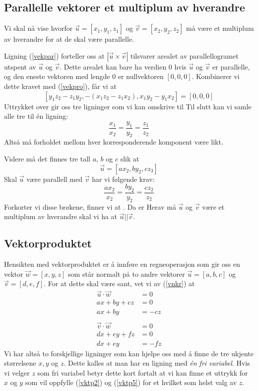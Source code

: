 \kryarvo

\newpage
{}
\subsection*{Parallelle vektorer et multiplum av hverandre}
Vi skal nå vise hvorfor $ {\vec{u}=[x_1, y_1, z_1]} $ og $ {\vec{v}=[x_2, y_2, z_2] }$ må være et multiplum av hverandre for at de skal være parallelle. \vsk

Ligning (\ref{vekpar}) forteller oss at $ |\vec{u}\times\vec{v}| $ tilsvarer arealet av parallellogramet utspent av $ \vec{u} $ og $ \vec{v} $. Dette arealet kan bare ha verdien 0 hvis $ \vec{u} $ og $ \vec{v} $ er parallelle, og den eneste vektoren med lengde 0 er nullvektoren $ [0,0,0] $. Kombinerer vi dette kravet med (\ref{vekpro}), får vi at
\[ [y_1z_2-z_1y_2, -(x_1z_2-z_1x_2), x_1y_2-y_1x_2]=[0, 0, 0] \]
Uttrykket over gir oss tre ligninger
som vi kan omskrive til
Til slutt kan vi samle alle tre til én ligning:
\[\frac{x_1}{x_2}= \frac{y_1}{y_2}=\frac{z_1}{z_2} \]
Altså må forholdet mellom hver korresponderende komponent være likt. \vsk

Videre må det finnes tre tall $ a $, $ b $ og $ c $ slik at
\[ \vec{u}=[ax_2, by_2, cz_3] \]
Skal $ \vec{u} $ være parallell med $ \vec{v} $ har vi følgende krav:
\[ \frac{ax_2}{x_2}= \frac{by_2}{y_2}=\frac{cz_2}{z_2} \]
Forkorter vi disse brøkene, finner vi at . Da er
Herav må $ \vec{u} $ og $ \vec{v} $ være et multiplum av hverandre skal vi ha at $ \vec{u}||\vec{v} $.
\subsection*{Vektorproduktet}
Hensikten med vektorproduktet er å innføre en regneoperasjon som gir oss en vektor $  {\vec{w}=[x, y, z]} $ som står normalt på to andre vektorer $ {\vec{u}=[a, b, c]} $ og $ {\vec{v}=[d, e, f]} $. For at dette skal være sant, vet vi av (\ref{vnkr}) at \vs
\begin{align}
	\vec{u}\cdot\vec{w}&=0 \nonumber \\ 
	ax+by+cz &=0 \nonumber\\
	ax+by &= -cz\label{vktp2}\\
	& \nonumber \\
	\vec{v}\cdot\vec{w}&=0 \nonumber \\ 
	dx+ey+fz&=0  \nonumber \\
	dx+ey&=-fz\label{vktp5}
\end{align}
Vi har altså to forskjellige ligninger som kan hjelpe oss med å finne de tre ukjente størrelsene $ x, y $ og $ z$. Dette kalles at man har en ligning med \textit{én fri variabel}. Hvis vi velger $ z $ som fri variabel betyr dette kort fortalt at vi kan finne et uttrykk for $ x $ og $ y $ som vil oppfylle (\ref{vktp2}) og (\ref{vktp5}) for et hvilket som helst valg av $ z $. \vsk

